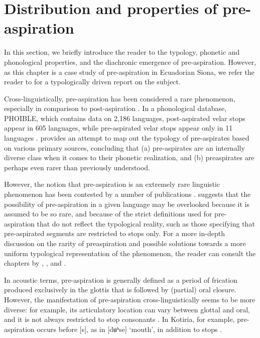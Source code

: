 \documentclass[output=paper]{langscibook}
\begin{document}
\section{Distribution and properties of pre-aspiration}\label{sec-preasp}
In this section, we briefly introduce the reader to the typology, phonetic and phonological properties, and the diachronic emergence of pre-aspiration. However, as this chapter is a case study of pre-aspiration in Ecuadorian Siona, we refer the reader to  for a typologically driven report on the subject. 

Cross-linguistically, pre-aspiration has been considered a rare phenomenon, especially in comparison to post-aspiration \citep{Silverman:2003}. In a phonological database, PHOIBLE, which contains data on 2,186 languages, post-aspirated velar stops appear in 605 languages, while pre-aspirated velar stops appear only in 11 languages \citep{MoranMcCloy:2019}. \citet{Silverman:2003} provides an attempt to map out the typology of pre-aspirates based on various primary sources, concluding that (a) pre-aspirates are an internally diverse class when it comes to their phonetic realization, and (b) preaspirates are perhaps even rarer than previously understood. 

However, the notion that pre-aspiration is an extremely rare linguistic phenomenon has been contested by a number of publications \citep{NiChasaide:1985, Helgason:2002, Hejna:2015}.  suggests that the possibility of pre-aspiration in a given language may be overlooked because it is assumed to be so rare, and because of the strict definitions used for pre-aspiration that do not reflect the typological reality, such as those specifying that pre-aspirated segments are restricted to stops only. For a more in-depth discussion on the rarity of preaspiration and possible solutions towards a more uniform typological representation of the phenomenon, the reader can consult the chapters by , , and .

In acoustic terms, pre-aspiration is generally defined as a period of frication produced exclusively in the glottis that is followed by (partial) oral closure. However, the manifestation of pre-aspiration cross-linguistically seems to be more diverse: for example, its articulatory location can vary between glottal and oral, and it is not always restricted to stop consonants . In Kotiria, for example, pre-aspiration occurs before [s], as in [dʉʰse] `mouth', in addition to stops \citep[25]{Stenzel:2013}.
\end{document}
